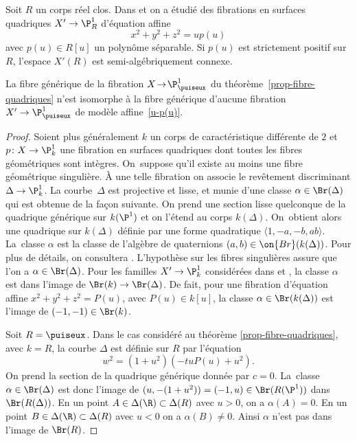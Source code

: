 Soit $R$ un corps réel clos. Dans \cite{colliot2024certaines} et \cite{benoist2026rationality} on a étudié des fibrations en surfaces quadriques $X'\to \P^1_R$ d'équation affine
\begin{equation}\label{u-p(u)} x^2+y^2+z^2= u p(u)\end{equation}
avec $p(u)\in R[u]$ un polynôme séparable. Si $p(u)$ est strictement positif sur $R$, l'espace $X'(R)$ est semi-algébriquement connexe.

\begin{prop}
La fibre générique de la fibration $X \!\to\! \P^1_{\puiseux}$ du théorème~\ref{prop-fibre-quadriques} n'est isomorphe à la fibre générique d'aucune fibration $X'\to \P^1_{\puiseux}$ de modèle affine~\eqref{u-p(u)}.
\end{prop}
\begin{proof}
Soient plus généralement $k$ un corps de caractéristique différente de $2$ et $p\colon X \to \P^1_{k}$ une fibration en surfaces quadriques dont toutes les fibres
géométriques sont intègres. On~suppose qu'il existe au moins une fibre
géométrique singulière.
À une telle fibration on associe le revêtement discriminant $\Delta \to \P^1_{k}$.
La courbe~$\Delta$ est projective et lisse, et munie d'une classe
$\alpha \in \Br(\Delta)$ qui est obtenue de la façon suivante.
On prend une section lisse quelconque de la quadrique générique sur $k(\P^1)$
et on l'étend au corps $k(\Delta)$. On~obtient alors une quadrique sur
$k(\Delta)$ définie par une forme quadratique $\langle 1,-a,-b,ab\rangle$. La~classe $\alpha$ est la classe de l'algèbre de quaternions $(a,b)\in \on{Br}(k(\Delta))$. Pour plus de détails, on consultera
\cite[Th.\,2.5]{colliot1993groupe}.
L'hypothèse sur les fibres singulières
assure que l'on a $\alpha \in \Br(\Delta)$.
Pour les familles $X' \to \P^1_{k}$ considérées
dans \cite{colliot2024certaines} et \cite{benoist2026rationality}, la classe $\alpha$ est dans l'image
de $\Br(k) \to \Br(\Delta)$. De fait, pour une fibration d'équation affine
$x^2+y^2+z^2=P(u)$, avec $P(u)\in k[u]$, la classe $\alpha \in \Br (k(\Delta))$ est l'image de $(-1,-1) \in \Br(k)$.

Soit $R=\puiseux$. Dans le cas considéré au théorème
\ref{prop-fibre-quadriques}, avec $k=R$,
la courbe $\Delta$ est définie sur $R$ par l'équation
\[
 w^2= (1+u^2)(-tuP(u)+u^2).
\]
On prend la section de la quadrique générique donnée par $c=0$. La~classe
$\alpha \in \Br(\Delta)$ est donc l'image de $(u,-(1+u^2))=(-1,u) \in \Br(R(\P^1))$ dans
$\Br(R(\Delta))$. En un point $A \in \Delta(\R) \subset \Delta(R)$ avec $u>0$,
on a $\alpha(A)=0$. En un point $B \in \Delta(\R) \subset \Delta(R)$
avec $u<0$ on a $\alpha(B)\neq 0$. Ainsi $\alpha$ n'est pas dans
l'image de $\Br(R)$.
\end{proof}

